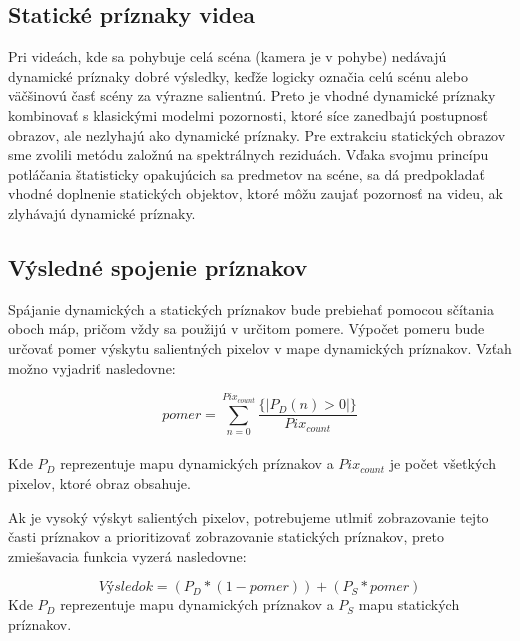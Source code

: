 \subsection{Statické príznaky videa}
Pri videách, kde sa pohybuje celá scéna (kamera je v pohybe) nedávajú dynamické príznaky dobré výsledky, keďže logicky označia celú scénu alebo väčšinovú časť scény za výrazne salientnú.
Preto je vhodné dynamické príznaky kombinovať s klasickými modelmi pozornosti, ktoré síce zanedbajú postupnosť obrazov, ale nezlyhajú ako dynamické príznaky.
Pre extrakciu statických obrazov sme zvolili metódu založnú na spektrálnych reziduách\cite{spectral-rezidual}.
Vďaka svojmu princípu potláčania štatisticky opakujúcich sa predmetov na scéne, sa dá predpokladať vhodné doplnenie statických objektov, ktoré môžu zaujať pozornosť na videu, ak zlyhávajú dynamické príznaky.

\subsection{Výsledné spojenie príznakov}
Spájanie dynamických a statických príznakov bude prebiehať pomocou sčítania oboch máp, pričom vždy sa použijú v určitom pomere.
Výpočet pomeru bude určovať pomer výskytu salientných pixelov v mape dynamických príznakov.
Vzťah možno vyjadriť nasledovne:

\begin{equation}
  pomer = \sum_{n=0}^{Pix_{count}} \frac{\{\left|P_D(n) > 0\right|\}}{Pix_{count}} 
\end{equation}
\\
Kde \begin{math}P_D\end{math} reprezentuje mapu dynamických príznakov a \begin{math}Pix_{count}\end{math} je počet všetkých pixelov, ktoré obraz obsahuje.

Ak je vysoký výskyt salientých pixelov, potrebujeme utlmiť zobrazovanie tejto časti príznakov a prioritizovať zobrazovanie statických príznakov, preto zmiešavacia funkcia vyzerá nasledovne:

\begin{equation}
  Výsledok = (P_D * (1-pomer)) + (P_S * pomer)
\end{equation}
Kde \begin{math}P_D\end{math} reprezentuje mapu dynamických príznakov a \begin{math}P_S\end{math} mapu statických príznakov.

